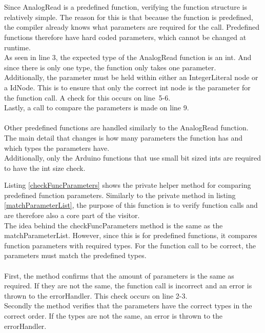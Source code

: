 \\\\
Since AnalogRead is a predefined function, verifying the function structure is relatively simple. The reason for this is that because the function is predefined, the compiler already knows what parameters are required for the call. Predefined functions therefore have hard coded parameters, which cannot be changed at runtime.\\
As seen in line 3, the expected type of the AnalogRead function is an int. And since there is only one type, the function only takes one parameter.\\
Additionally, the parameter must be held within either an IntegerLiteral node or a IdNode. This is to ensure that only the correct int node is the parameter for the function call. A check for this occurs on line 5-6.\\
Lastly, a call to compare the parameters is made on line 9.
\\\\
Other predefined functions are handled similarly to the AnalogRead function. The main detail that changes is how many parameters the function has and which types the parameters have.\\
Additionally, only the Arduino functions that use small bit sized ints are required to have the int size check.

\noindent\newline
Listing \ref{checkFuncParameters} shows the private helper method for comparing predefined function parameters. Similarly to the private method in listing \ref{matchParameterList}, the purpose of this function is to verify function calls and are therefore also a core part of the visitor.\\
The idea behind the checkFuncParameters method is the same as the matchParameterList. However, since this is for predefined functions, it compares function parameters with required types. For the function call to be correct, the parameters must match the predefined types.
\\\\
First, the method confirms that the amount of parameters is the same as required. If they are not the same, the function call is incorrect and an error is thrown to the errorHandler. This check occurs on line 2-3.\\
Secondly the method verifies that the parameters have the correct types in the correct order. If the types are not the same, an error is thrown to the errorHandler.\\
